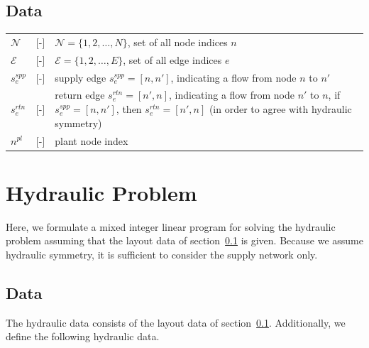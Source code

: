 \documentclass[a4paper,10pt]{article}
\begin{document}
\subsection{Data}\label{sec:layoutData}

\begin{tabularx}{\textwidth}{llX}
  $\mathcal{N}$ &[-]& $\mathcal{N} = \{1,2,\dots,N\}$,
                      set of all node indices $n$\\
  $\mathcal{E}$ &[-]& $\mathcal{E} = \{1,2,\dots,E\}$,
                      set of all edge indices $e$\\
  $s_e^{spp}$         &[-]& supply edge $s_e^{spp}=[n,n']$, 
                      indicating a flow from node $n$ to $n'$\\
  $s_e^{rtn}$         &[-]& return edge $s_e^{rtn}=[n',n]$, 
                      indicating a flow from node $n'$ to $n$,
                      if $s_e^{spp}=[n,n']$, then $s_e^{rtn}=[n',n]$ (in order to agree with hydraulic symmetry)\\
  $n^{pl}$      &[-]& plant node index
\end{tabularx}



\section{Hydraulic Problem}

Here, we formulate a mixed integer linear program for solving the hydraulic problem assuming that the layout data of section~\ref{sec:layoutData} is given.
Because we assume hydraulic symmetry, it is sufficient to consider the supply network only. 

\subsection{Data}\label{sec:hydraulicData}

The hydraulic data consists of the layout data of section~\ref{sec:layoutData}.
Additionally, we define the following hydraulic data.
\end{document}
